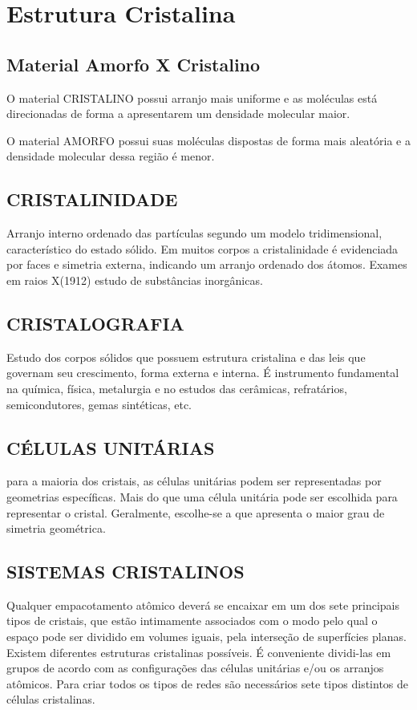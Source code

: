 

\section{Estrutura Cristalina}

\subsection*{Material Amorfo X Cristalino}
O material CRISTALINO possui arranjo mais uniforme e as moléculas está direcionadas de forma a apresentarem um densidade molecular maior. 

O material AMORFO possui suas moléculas dispostas de forma mais aleatória e a densidade molecular dessa região é menor.


\subsection*{CRISTALINIDADE} Arranjo interno ordenado das partículas segundo um modelo tridimensional, característico do estado sólido. Em muitos corpos a cristalinidade é evidenciada por faces e simetria externa, indicando um arranjo ordenado dos átomos. Exames em raios X(1912) estudo de substâncias inorgânicas.

\subsection*{CRISTALOGRAFIA} Estudo dos corpos sólidos que possuem estrutura cristalina e das leis que governam seu crescimento, forma externa e interna. É instrumento fundamental na química, física, metalurgia e no estudos das cerâmicas, refratários, semicondutores, gemas sintéticas, etc.


\subsection*{CÉLULAS UNITÁRIAS} para a maioria dos cristais, as células unitárias podem ser representadas por geometrias específicas. Mais do que uma célula unitária pode ser escolhida para representar o cristal. Geralmente, escolhe-se a que apresenta o maior grau de simetria geométrica.



\subsection*{SISTEMAS CRISTALINOS} Qualquer empacotamento atômico deverá se encaixar em um dos sete principais tipos de cristais, que estão intimamente associados com o modo pelo qual o espaço pode ser dividido em volumes iguais, pela interseção de superfícies planas.
Existem diferentes estruturas cristalinas possíveis. É conveniente dividi-las em grupos de acordo com as configurações das células unitárias e/ou os arranjos atômicos. Para criar todos os tipos de redes são necessários sete tipos distintos de células cristalinas.


